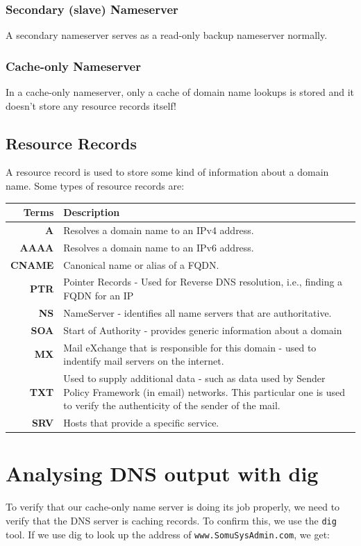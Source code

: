 \subsubsection{Secondary (slave) Nameserver}
\vspace{-10pt}
A secondary nameserver serves as a read-only backup nameserver normally. 

\subsubsection{Cache-only Nameserver}
\vspace{-10pt}
In a cache-only nameserver, only a cache of domain name lookups is stored and it doesn't store any resource records itself!

\subsection{Resource Records}
A resource record is used to store some kind of information about a domain name. Some types of resource records are:

\noindent
\begin{tabular}{rM{0.85}}
	\toprule
	\textbf{Terms} &\textbf{Description} \\
	\midrule
	\textbf{A}	&Resolves a domain name to an IPv4 address.\\
	\textbf{AAAA}	&Resolves a domain name to an IPv6 address.\\
	\textbf{CNAME}	&Canonical name or alias of a FQDN.\\
	\textbf{PTR}	&Pointer Records - Used for Reverse DNS resolution, i.e., finding a FQDN for an IP\\
	\textbf{NS}	&NameServer - identifies all name servers that are authoritative.\\
	\textbf{SOA} &Start of Authority - provides generic information about a domain\\
	\textbf{MX}	&Mail eXchange that is responsible for this domain - used to indentify mail servers on the internet.\\
	\textbf{TXT} &Used to supply additional data - such as data used by Sender Policy Framework (in email) networks. This particular one is used to verify the authenticity of the sender of the mail. \\ 
	\textbf{SRV} &Hosts that provide a specific service. \\
	\bottomrule
\end{tabular}

	\section{Analysing DNS output with dig}
To verify that our cache-only name server is doing its job properly, we need to verify that the DNS server is caching records. To confirm this, we use the \verb|dig| tool. If we use dig to look up the address of \verb|www.SomuSysAdmin.com|, we get:

